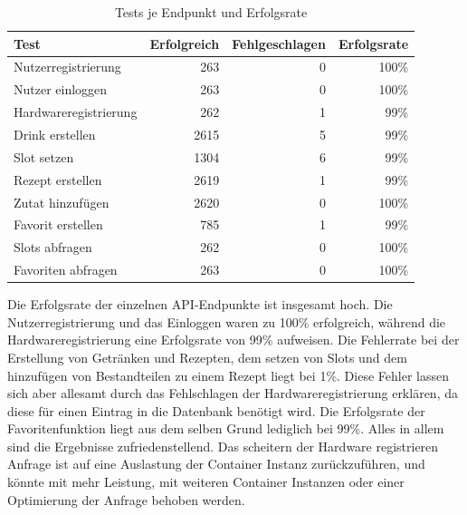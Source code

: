 \begin{table}[H]
    \centering
        \begin{tabular}{|l|r|r|r|}
            \hline
            \textbf{Test} & \textbf{Erfolgreich} & \textbf{Fehlgeschlagen} & \textbf{Erfolgsrate} \\
            \hline
            Nutzerregistrierung   &  263 &   0 &  100\% \\
            Nutzer einloggen      &  263 &   0 &  100\% \\
            Hardwareregistrierung &  262 &   1 &   99\% \\
            Drink erstellen       & 2615 &   5 &   99\% \\
            Slot setzen           & 1304 &   6 &   99\% \\
            Rezept erstellen      & 2619 &   1 &   99\% \\
            Zutat hinzufügen      & 2620 &   0 &  100\% \\
            Favorit erstellen     &  785 &   1 &   99\% \\
            Slots abfragen        &  262 &   0 &  100\% \\
            Favoriten abfragen    &  263 &   0 &  100\% \\
            \hline
        \end{tabular}
    \caption{Tests je Endpunkt und Erfolgsrate}
    \label{tab:test_success_rate}    
\end{table}

Die Erfolgsrate der einzelnen API-Endpunkte ist insgesamt hoch. Die Nutzerregistrierung und das 
Einloggen waren zu 100\% erfolgreich, während die Hardwareregistrierung eine Erfolgsrate von 99\% 
aufweisen. Die Fehlerrate bei der Erstellung von Getränken und Rezepten, dem setzen von Slots und 
dem hinzufügen von Bestandteilen zu einem Rezept liegt bei 1\%. Diese Fehler lassen sich aber 
allesamt durch das Fehlschlagen der Hardwareregistrierung erklären, da diese für einen Eintrag in 
die Datenbank benötigt wird. Die Erfolgsrate der Favoritenfunktion liegt aus dem selben Grund 
lediglich bei 99\%. Alles in allem sind die Ergebnisse zufriedenstellend. 
Das scheitern der Hardware registrieren Anfrage ist auf eine Auslastung der Container Instanz 
zurückzuführen, und könnte mit mehr Leistung, mit weiteren Container Instanzen oder einer 
Optimierung der Anfrage behoben werden.

